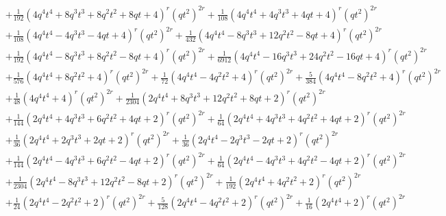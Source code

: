 \documentclass[11pt,english]{amsart}
\numberwithin{equation}{section}
\numberwithin{figure}{section}
\theoremstyle{plain}
\theoremstyle{plain}
\theoremstyle{definition}
\theoremstyle{remark}
\begin{document}
{\begin{align*}
& + \frac{1}{192}  {\left(4  q^{4} t^{4} + 8  q^{3} t^{3} + 8  q^{2} t^{2} + 8  q t + 4\right)}^{r} \left(q t^{2}\right)^{2  r} + \frac{1}{108}  {\left(4  q^{4} t^{4} + 4  q^{3} t^{3} + 4  q t + 4\right)}^{r} \left(q t^{2}\right)^{2  r} \\
& + \frac{1}{108}  {\left(4  q^{4} t^{4} - 4  q^{3} t^{3} - 4  q t + 4\right)}^{r} \left(q t^{2}\right)^{2  r} + \frac{1}{432}  {\left(4  q^{4} t^{4} - 8  q^{3} t^{3} + 12  q^{2} t^{2} - 8  q t + 4\right)}^{r} \left(q t^{2}\right)^{2  r} \\
& + \frac{1}{192}  {\left(4  q^{4} t^{4} - 8  q^{3} t^{3} + 8  q^{2} t^{2} - 8  q t + 4\right)}^{r} \left(q t^{2}\right)^{2  r} + \frac{1}{6912}  {\left(4  q^{4} t^{4} - 16  q^{3} t^{3} + 24  q^{2} t^{2} - 16  q t + 4\right)}^{r} \left(q t^{2}\right)^{2  r} \\
& + \frac{1}{576}  {\left(4  q^{4} t^{4} + 8  q^{2} t^{2} + 4\right)}^{r} \left(q t^{2}\right)^{2  r} + \frac{1}{72}  {\left(4  q^{4} t^{4} - 4  q^{2} t^{2} + 4\right)}^{r} \left(q t^{2}\right)^{2  r} + \frac{5}{384}  {\left(4  q^{4} t^{4} - 8  q^{2} t^{2} + 4\right)}^{r} \left(q t^{2}\right)^{2  r} \\
& + \frac{1}{48}  {\left(4  q^{4} t^{4} + 4\right)}^{r} \left(q t^{2}\right)^{2  r} + \frac{1}{2304}  {\left(2  q^{4} t^{4} + 8  q^{3} t^{3} + 12  q^{2} t^{2} + 8  q t + 2\right)}^{r} \left(q t^{2}\right)^{2  r} \\
& + \frac{1}{144}  {\left(2  q^{4} t^{4} + 4  q^{3} t^{3} + 6  q^{2} t^{2} + 4  q t + 2\right)}^{r} \left(q t^{2}\right)^{2  r} + \frac{1}{64}  {\left(2  q^{4} t^{4} + 4  q^{3} t^{3} + 4  q^{2} t^{2} + 4  q t + 2\right)}^{r} \left(q t^{2}\right)^{2  r} \\
& + \frac{1}{36}  {\left(2  q^{4} t^{4} + 2  q^{3} t^{3} + 2  q t + 2\right)}^{r} \left(q t^{2}\right)^{2  r} + \frac{1}{36}  {\left(2  q^{4} t^{4} - 2  q^{3} t^{3} - 2  q t + 2\right)}^{r} \left(q t^{2}\right)^{2  r} \\
& + \frac{1}{144}  {\left(2  q^{4} t^{4} - 4  q^{3} t^{3} + 6  q^{2} t^{2} - 4  q t + 2\right)}^{r} \left(q t^{2}\right)^{2  r} + \frac{1}{64}  {\left(2  q^{4} t^{4} - 4  q^{3} t^{3} + 4  q^{2} t^{2} - 4  q t + 2\right)}^{r} \left(q t^{2}\right)^{2  r} \\
& + \frac{1}{2304}  {\left(2  q^{4} t^{4} - 8  q^{3} t^{3} + 12  q^{2} t^{2} - 8  q t + 2\right)}^{r} \left(q t^{2}\right)^{2  r} + \frac{1}{192}  {\left(2  q^{4} t^{4} + 4  q^{2} t^{2} + 2\right)}^{r} \left(q t^{2}\right)^{2  r} \\
& + \frac{1}{24}  {\left(2  q^{4} t^{4} - 2  q^{2} t^{2} + 2\right)}^{r} \left(q t^{2}\right)^{2  r} + \frac{5}{128}  {\left(2  q^{4} t^{4} - 4  q^{2} t^{2} + 2\right)}^{r} \left(q t^{2}\right)^{2  r} + \frac{1}{16}  {\left(2  q^{4} t^{4} + 2\right)}^{r} \left(q t^{2}\right)^{2  r} \\

\end{align*}}
\end{document}
